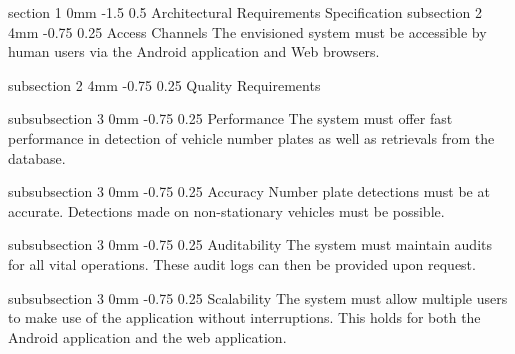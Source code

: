 \documentclass[12pt]{article}
\makeatletter
\renewcommand{\section}{\@startsection
   {section}%
   {1}%
   {0mm}%
   {-1.5\baselineskip}%
   {0.5\baselineskip}%
   {\sffamily\bfseries\upshape\normalsize}}%
\renewcommand{\subsection}{\@startsection
   {subsection}%
   {2}%
   {4mm}%
   {-0.75\baselineskip}%
   {0.25\baselineskip}%
   {\rmfamily\normalfont\scshape\normalsize}}%
\renewcommand{\subsubsection}{\@startsection
   {subsubsection}%
   {3}%
   {0mm}%
   {-0.75\baselineskip}%
   {0.25\baselineskip}%
   {\rmfamily\normalfont\slshape\normalsize}}%
\makeatother
\begin{document}
                \section{Architectural Requirements Specification}
                		\subsection{Access Channels }
                				The envisioned system must be accessible by human users via the Android application and Web browsers.
                			
                		\subsection{Quality Requirements}
                		
                				\subsubsection{Performance}
		   			                  	The system must offer fast performance in detection of vehicle number plates as well as retrievals from the database.
		   			                  	
                			    \subsubsection{Accuracy}
                			    		Number plate detections must be at accurate. Detections made on non-stationary vehicles must be possible.
                			    		             	
                				\subsubsection{Auditability}
		   			                   	The system must maintain audits for all vital operations. These audit logs can then be provided upon request. 
		   			            		
                				\subsubsection{Scalability}
	   			                   		The system must allow multiple users to make use of the application without interruptions. This holds for both the Android application and the web application.
		       			                  	
\end{document}
